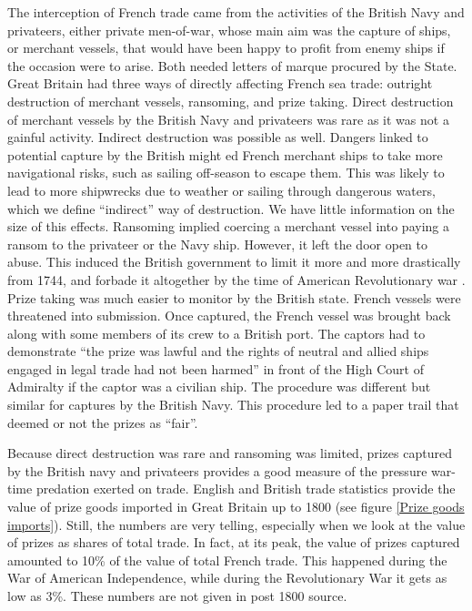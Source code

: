 \documentclass[12pt,a4paper,notitlepage,english]{article}
\begin{document}
The interception of French trade came from the activities of the British Navy and privateers, either private men-of-war, whose main aim was the capture of ships, or merchant vessels, that would have been happy to profit from enemy ships if the occasion were to arise.
Both needed letters of marque procured by the State.
Great Britain had three ways of directly affecting French sea trade: outright destruction of merchant vessels, ransoming, and prize taking.
Direct destruction of merchant vessels by the British Navy and privateers was rare as it was not a gainful activity.
Indirect destruction was possible as well.
Dangers linked to potential capture by the British might ed French merchant ships to take more navigational risks, such as sailing off-season to escape them.
This was likely to lead to more shipwrecks due to weather or sailing through dangerous waters, which we define ``indirect'' way of destruction.
We have little information on the size of this effects.
Ransoming implied coercing a merchant vessel into paying a ransom to the privateer or the Navy ship.
However, it left the door open to abuse.
This induced the British government to limit it more and more drastically from 1744, and forbade it altogether by the time of American Revolutionary war \cite[see][p. 734]{Hillmann2011}.
Prize taking was much easier to monitor by the British state.
French vessels were threatened into submission.
Once captured, the French vessel was brought back along with some members of its crew to a British port.
The captors had to demonstrate ``the prize was lawful and the rights of neutral and allied ships engaged in legal trade had not been harmed'' \cite[see][p. 734]{Hillmann2011} in front of the High Court of Admiralty if the captor was a civilian ship.
The procedure was different but similar for captures by the British Navy.
This procedure led to a paper trail that deemed or not the prizes as ``fair''.

Because direct destruction was rare and ransoming was limited, prizes captured by the British navy and privateers provides a good measure of the pressure war-time predation exerted on trade.
English and British trade statistics provide the value of prize goods imported in Great Britain up to 1800 (see figure \ref{Prize goods imports}).
Still, the numbers are very telling, especially when we look at the value of prizes as shares of total trade.
In fact, at its peak, the value of prizes captured amounted to 10\% of the value of total French trade. 
This happened during the War of American Independence, while during the Revolutionary War it gets as low as 3\%.
These numbers are not given in post 1800 source.
\end{document}

